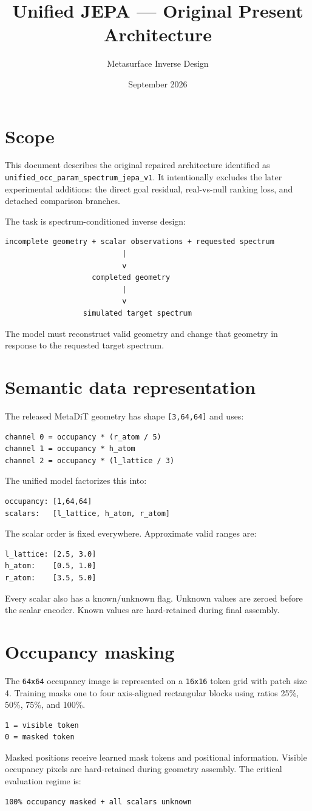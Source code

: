 \documentclass[11pt,a4paper]{article}
\title{Unified JEPA --- Original Present Architecture}
\author{Metasurface Inverse Design}
\date{September 2026}
\begin{document}
\maketitle
\tableofcontents
\newpage

\section{Scope}
This document describes the original repaired architecture identified as
\texttt{unified\_occ\_param\_spectrum\_jepa\_v1}. It intentionally excludes the
later experimental additions: the direct goal residual, real-vs-null ranking
loss, and detached comparison branches.

The task is spectrum-conditioned inverse design:
\begin{lstlisting}
incomplete geometry + scalar observations + requested spectrum
                           |
                           v
                    completed geometry
                           |
                           v
                  simulated target spectrum
\end{lstlisting}
The model must reconstruct valid geometry and change that geometry in response
to the requested target spectrum.

\section{Semantic data representation}
The released MetaDiT geometry has shape \texttt{[3,64,64]} and uses:
\begin{lstlisting}
channel 0 = occupancy * (r_atom / 5)
channel 1 = occupancy * h_atom
channel 2 = occupancy * (l_lattice / 3)
\end{lstlisting}
The unified model factorizes this into:
\begin{lstlisting}
occupancy: [1,64,64]
scalars:   [l_lattice, h_atom, r_atom]
\end{lstlisting}
The scalar order is fixed everywhere. Approximate valid ranges are:
\begin{lstlisting}
l_lattice: [2.5, 3.0]
h_atom:    [0.5, 1.0]
r_atom:    [3.5, 5.0]
\end{lstlisting}
Every scalar also has a known/unknown flag. Unknown values are zeroed before
the scalar encoder. Known values are hard-retained during final assembly.

\section{Occupancy masking}
The \texttt{64x64} occupancy image is represented on a \texttt{16x16} token
grid with patch size 4. Training masks one to four axis-aligned rectangular
blocks using ratios 25\%, 50\%, 75\%, and 100\%.
\begin{lstlisting}
1 = visible token
0 = masked token
\end{lstlisting}
Masked positions receive learned mask tokens and positional information.
Visible occupancy pixels are hard-retained during geometry assembly. The
critical evaluation regime is:
\begin{lstlisting}
100% occupancy masked + all scalars unknown
\end{lstlisting}
\end{document}
